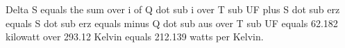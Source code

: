 Delta S equals the sum over i of Q dot sub i over T sub UF plus S dot sub erz equals S dot sub erz equals minus Q dot sub aus over T sub UF equals 62.182 kilowatt over 293.12 Kelvin equals 212.139 watts per Kelvin.